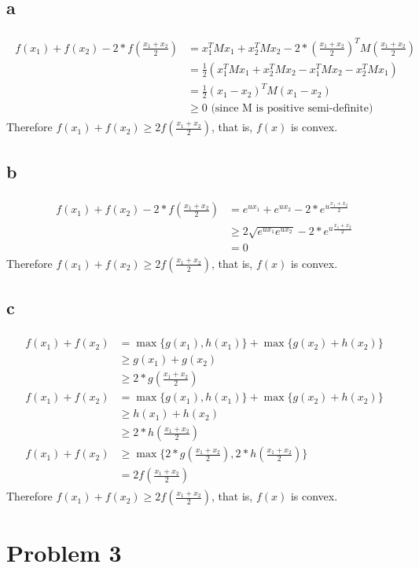 \documentclass[a4paper,11pt]{article}
\theoremstyle{mytheor}
\newcommand{\myequ}[1]{\begin{align}\begin{split} #1 \end{split}\end{align}}
\begin{document}
\subsection*{a}
\myequ{
	f(x_1) + f(x_2) -  2 * f(\frac{x_1 + x_2}{2}) & = x_1^T M x_1 + x_2^T M x_2 - 
		2 * (\frac{x_1+x_2}{2})^T M (\frac{x_1+x_2}{2}) \\
		& =	\frac{1}{2} (x_1^T M x_1 + x_2^T M x_2 - x_1^T M x_2 - x_2^T M x_1) \\
		& = \frac{1}{2} (x_1-x_2)^T M (x_1-x_2) \\
		& \geq 0 \text{ (since M is positive semi-definite)}
}	
Therefore $f(x_1) + f(x_2) \geq 2 f(\frac{x_1+x_2}{2})$, that is, $f(x)$ is convex.

\subsection*{b}
\myequ{
	f(x_1) + f(x_2) -  2 * f(\frac{x_1 + x_2}{2}) &=
		e^{u x_1} + e^{u x_2} - 2 * e^{u \frac{x_1+x_2}{2}} \\
		& \geq 2 \sqrt{e^{u x_1} e^{u x_2}} - 2 * e^{u \frac{x_1+x_2}{2}} \\
		& = 0
}
Therefore $f(x_1) + f(x_2) \geq 2 f(\frac{x_1+x_2}{2})$, that is, $f(x)$ is convex.

\subsection*{c}
\myequ{
	f(x_1) + f(x_2) & = \max\{g(x_1), h(x_1)\} + \max\{g(x_2) + h(x_2)\}	\\
		&\geq g(x_1) + g(x_2) \\
		&\geq 2 * g(\frac{x_1 + x_2}{2}) \\
	f(x_1) + f(x_2) & = \max\{g(x_1), h(x_1)\} + \max\{g(x_2) + h(x_2)\}	\\
		&\geq h(x_1) + h(x_2) \\
		&\geq 2 * h(\frac{x_1 + x_2}{2})	\\
	f(x_1) + f(x_2) & \geq  \max\{2 * g(\frac{x_1 + x_2}{2}), 2 * h(\frac{x_1 + x_2}{2})\}\\
					& = 2 f(\frac{x_1 + x_2}{2}) 
}
Therefore $f(x_1) + f(x_2) \geq 2 f(\frac{x_1+x_2}{2})$, that is, $f(x)$ is convex.

\section*{Problem 3}
\end{document}
